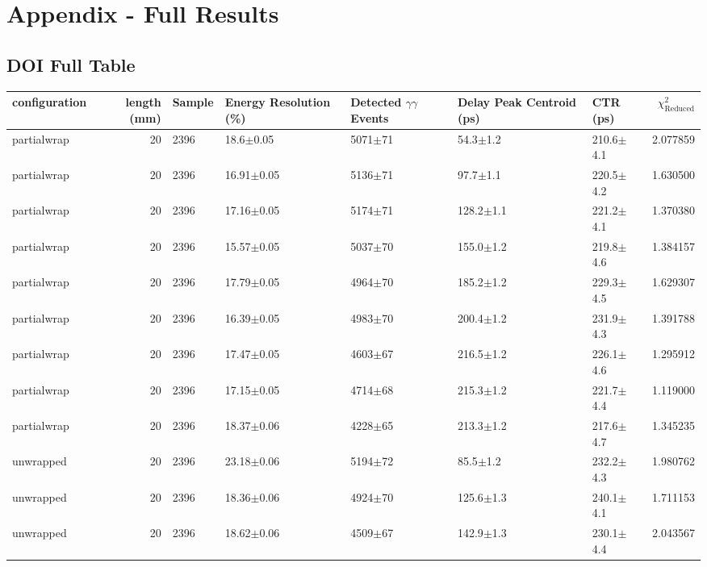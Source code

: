\section*{Appendix - Full Results}

\subsection{DOI Full Table}
\begin{tabular}{lrlllllr}
\hline
configuration &  length (mm) & Sample & Energy Resolution (\%) & Detected $\gamma\gamma$ Events & Delay Peak Centroid (ps) & CTR (ps) &  $\chi^2_\text{Reduced}$ \\
\hline
  partialwrap &      20 &    2396 &    18.6$\pm$0.05 &  5071$\pm$71 &    54.3$\pm$1.2 &   210.6$\pm$4.1 &    2.077859 \\
  partialwrap &      20 &    2396 &   16.91$\pm$0.05 &  5136$\pm$71 &    97.7$\pm$1.1 &   220.5$\pm$4.2 &    1.630500 \\
  partialwrap &      20 &    2396 &   17.16$\pm$0.05 &  5174$\pm$71 &   128.2$\pm$1.1 &   221.2$\pm$4.1 &    1.370380 \\
  partialwrap &      20 &    2396 &   15.57$\pm$0.05 &  5037$\pm$70 &   155.0$\pm$1.2 &   219.8$\pm$4.6 &    1.384157 \\
  partialwrap &      20 &    2396 &   17.79$\pm$0.05 &  4964$\pm$70 &   185.2$\pm$1.2 &   229.3$\pm$4.5 &    1.629307 \\
  partialwrap &      20 &    2396 &   16.39$\pm$0.05 &  4983$\pm$70 &   200.4$\pm$1.2 &   231.9$\pm$4.3 &    1.391788 \\
  partialwrap &      20 &    2396 &   17.47$\pm$0.05 &  4603$\pm$67 &   216.5$\pm$1.2 &   226.1$\pm$4.6 &    1.295912 \\
  partialwrap &      20 &    2396 &   17.15$\pm$0.05 &  4714$\pm$68 &   215.3$\pm$1.2 &   221.7$\pm$4.4 &    1.119000 \\
  partialwrap &      20 &    2396 &   18.37$\pm$0.06 &  4228$\pm$65 &   213.3$\pm$1.2 &   217.6$\pm$4.7 &    1.345235 \\
    unwrapped &      20 &    2396 &   23.18$\pm$0.06 &  5194$\pm$72 &    85.5$\pm$1.2 &   232.2$\pm$4.3 &    1.980762 \\
    unwrapped &      20 &    2396 &   18.36$\pm$0.06 &  4924$\pm$70 &   125.6$\pm$1.3 &   240.1$\pm$4.1 &    1.711153 \\
    unwrapped &      20 &    2396 &   18.62$\pm$0.06 &  4509$\pm$67 &   142.9$\pm$1.3 &   230.1$\pm$4.4 &    2.043567 \\

\end{tabular}
